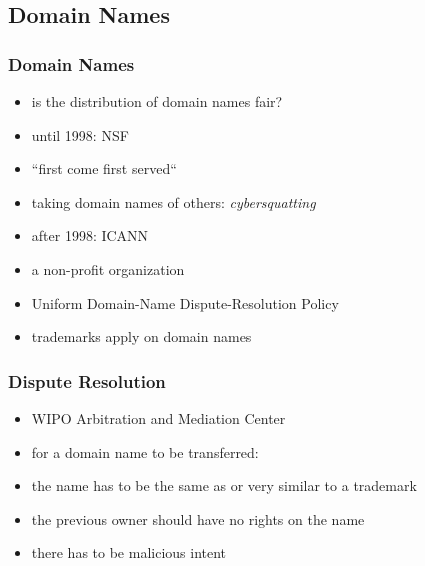 \documentclass[dvipsnames]{beamer}
\theoremstyle{plain}
\begin{document}
\subsection{Domain Names}

\begin{frame}
  \frametitle{Domain Names}

  \begin{itemize}
    \item is the distribution of domain names fair?

    \bigskip
    \item until 1998: NSF
    \item ``first come first served``
    \item taking domain names of others: \emph{cybersquatting}

    \pause
    \medskip
    \item after 1998: ICANN
    \item a non-profit organization
    \item Uniform Domain-Name Dispute-Resolution Policy
    \item trademarks apply on domain names
  \end{itemize}
\end{frame}

\begin{frame}
  \frametitle{Dispute Resolution}

  \begin{itemize}
    \item WIPO Arbitration and Mediation Center

    \bigskip
    \item for a domain name to be transferred:
    \smallskip
    \item the name has to be the same as or very similar to a trademark
    \item the previous owner should have no rights on the name
    \item there has to be malicious intent
  \end{itemize}
\end{frame}
\end{document}
